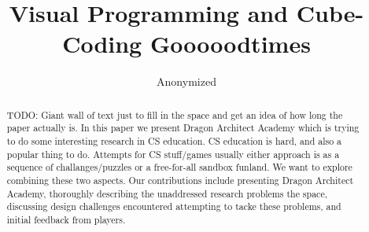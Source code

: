 \documentclass{sig-alternate}
\newcommand{\TODO}[1]{{\color{red} TODO: #1}}
\newcommand{\gametitle}{{\color{RoyalPurple} Dragon Architect Academy}}
\begin{document}
%

\title{Visual Programming and Cube-Coding Gooooodtimes}

\author{Anonymized}


\maketitle
\begin{abstract}

    \TODO{Giant wall of text just to fill in the space and get an idea of how long the paper actually is. In this paper we present \gametitle{} which is trying to do some interesting research in CS education. CS education is hard, and also a popular thing to do. Attempts for CS stuff/games usually either approach is as a sequence of challanges/puzzles or a free-for-all sandbox funland. We want to explore combining these two aspects. Our contributions include presenting \gametitle{}, thoroughly describing the unaddressed research problems the space, discussing design challenges encountered attempting to tacke these problems, and initial feedback from players.}
\end{abstract}



\end{document}
